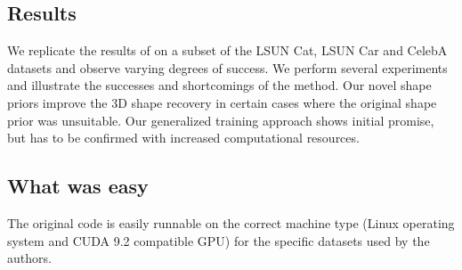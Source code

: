 \subsection*{Results}

We replicate the results of \cite{gan2shape} on a subset of the LSUN Cat, LSUN Car and CelebA datasets and observe varying degrees of success. We perform several experiments and illustrate the successes and shortcomings of the method. Our novel shape priors improve the 3D shape recovery in certain cases where the original shape prior was unsuitable. Our generalized training approach shows initial promise, but has to be confirmed with increased computational resources.

\subsection*{What was easy}
The original code is easily runnable on the correct machine type (Linux operating system and CUDA 9.2 compatible GPU) for the specific datasets used by the authors.

